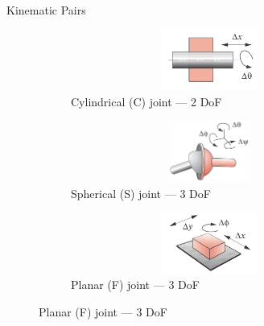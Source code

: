 \documentclass[aspectratio=169]{beamer}
\begin{document}
\begin{frame}[t]{Kinematic Pairs}
\begin{figure}[H]
    \begin{subfigure}{0.32\textwidth}
        \centering\includegraphics[height=2cm,width=1\textwidth,keepaspectratio]{C_joint.png}
        \caption{Cylindrical (C) joint --- 2 DoF}
        \label{fig:C_joint.png}
    \end{subfigure}
    \begin{subfigure}{0.32\textwidth}
        \centering\includegraphics[height=2cm,width=1\textwidth,keepaspectratio]{S_joint.png}
        \caption{Spherical (S) joint --- 3 DoF}
        \label{fig:S_joint.png}
    \end{subfigure}
    \begin{subfigure}{0.32\textwidth}
        \centering\includegraphics[height=2cm,width=1\textwidth,keepaspectratio]{F_joint.png}
        \caption{Planar (F) joint --- 3 DoF}
        \label{fig:F_joint.png}
    \end{subfigure}
\end{figure}
\end{frame}
\end{document}
